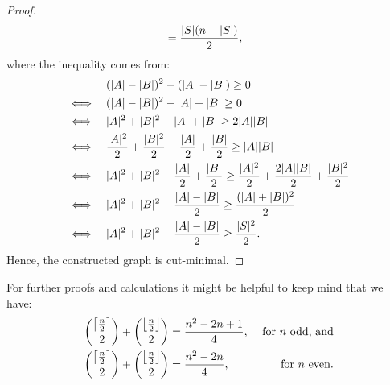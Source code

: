 \begin{prop}
\begin{proof}
\begin{align}
&=\frac{|S|(n-|S|)}{2},\notag
\end{align}
where the inequality comes from:
\begin{align}
&\quad\quad\quad\:\, (|A|-|B|)^2-(|A|-|B|)\geq 0\notag\\
&\Longleftrightarrow\quad (|A|-|B|)^2-|A|+|B|\geq 0\notag\\
&\Longleftrightarrow\quad |A|^2+|B|^2-|A|+|B|\geq 2|A||B|\notag\\
&\Longleftrightarrow\quad \frac{|A|^2}{2}+\frac{|B|^2}{2}-\frac{|A|}{2}+\frac{|B|}{2}\geq |A||B|\notag\\
&\Longleftrightarrow\quad |A|^2+|B|^2-\frac{|A|}{2}+\frac{|B|}{2}\geq \frac{|A|^2}{2}+\frac{2|A||B|}{2}+\frac{|B|^2}{2}\notag\\
&\Longleftrightarrow\quad |A|^2+|B|^2-\frac{|A|-|B|}{2}\geq\frac{(|A|+|B|)^2}{2}\notag\\
&\Longleftrightarrow\quad |A|^2+|B|^2-\frac{|A|-|B|}{2}\geq\frac{|S|^2}{2}.\notag
\end{align}
Hence, the constructed graph is cut-minimal.
\end{proof}
\end{prop}
\begin{rem}
For further proofs and calculations it might be helpful to keep mind that we have:
\begin{align}
&\binom{\left\lceil\frac{n}{2}\right\rceil}{2}+\binom{\left\lfloor\frac{n}{2}\right\rfloor}{2}=\frac{n^2-2n+1}{4},&\text{ for }n\text{ odd, and}\notag \\
&\binom{\left\lceil\frac{n}{2}\right\rceil}{2}+\binom{\left\lfloor\frac{n}{2}\right\rfloor}{2}=\frac{n^2-2n}{4},&\text{ for }n\text{ even.}\notag
\end{align}
\end{rem}
